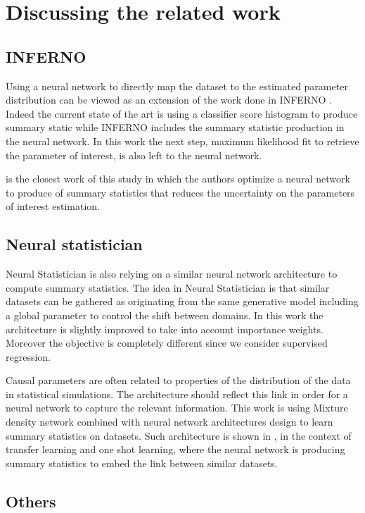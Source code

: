 \section{Discussing the related work} %
\label{sec:discussing_the_related_work}

\subsection{INFERNO} %
\label{sub:inferno}

Using a neural network to directly map the dataset to the estimated parameter distribution can be viewed as an extension of the work done in INFERNO \cite{DECASTRO2019170inferno}. 
Indeed the current state of the art is using a classifier score histogram to produce summary static while INFERNO includes the summary statistic production in the neural network.
In this work the next step, maximum likelihood fit to retrieve the parameter of interest, is also left to the neural network.


\cite{DECASTRO2019170inferno} is the closest work of this study in which the authors optimize a neural network to produce of summary statistics that reduces the uncertainty on the parameters of interest estimation.

\subsection{Neural statistician} %
\label{sub:neural_statistician}

Neural Statistician \cite{Edwards17neuralstatistician} is also relying on a similar neural network architecture to compute summary statistics.
The idea in Neural Statistician is that similar datasets can be gathered as originating from the same generative model including a global parameter to control the shift between domains.
In this work the architecture is slightly improved to take into account importance weights.
Moreover the objective is completely different since we consider supervised regression.

Causal parameters are often related to properties of the distribution of the data in statistical simulations.
The architecture should reflect this link in order for a neural network to capture the relevant information.
This work is using Mixture density network \cite{Bishop94mixturedensity} combined with neural network architectures design to learn summary statistics on datasets.
Such architecture is shown in \cite{Edwards17neuralstatistician}, in the context of transfer learning and one shot learning, where the neural network is producing summary statistics to embed the link between similar datasets.



\subsection{Others} %
\label{sub:others}


